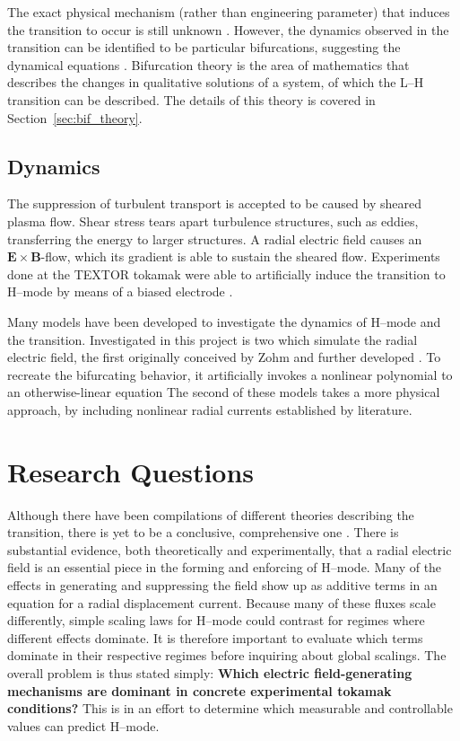 The exact physical mechanism (rather than engineering parameter) that induces the transition to occur is still unknown \cite{itoh_structural_2016}.
However, the dynamics observed in the transition can be identified to be particular bifurcations, suggesting the dynamical equations \cite{weymiens_bifurcation_2012}.
Bifurcation theory is the area of mathematics that describes the changes in qualitative solutions of a system, of which the L--H transition can be described.
The details of this theory is covered in Section~\ref{sec:bif_theory}.

\subsection{Dynamics}\label{ssec:dynamics}
The suppression of turbulent transport is accepted to be caused by sheared plasma flow.
Shear stress tears apart turbulence structures, such as eddies, transferring the energy to larger structures.
A radial electric field causes an $\mathbf{E}\times\mathbf{B}$-flow, which its gradient is able to sustain the sheared flow.
Experiments done at the TEXTOR tokamak were able to artificially induce the transition to H--mode by means of a biased electrode \cite{weynants_confinement_1992}.

Many models have been developed to investigate the dynamics of H--mode and the transition.
Investigated in this project is two which simulate the radial electric field, the first originally conceived by Zohm \cite{zohm_dynamic_1994} and further developed \cite{paquay_studying_2012} \cite{weymiens_bifurcation_2014}.
To recreate the bifurcating behavior, it artificially invokes a nonlinear polynomial to an otherwise-linear equation
The second of these models takes a more physical approach, by including nonlinear radial currents established by literature.

\section{Research Questions}\label{sec:research_questions}
Although there have been compilations of different theories describing the transition, there is yet to be a conclusive, comprehensive one \cite{connor_review_2000}.
There is substantial evidence, both theoretically and experimentally, that a radial electric field is an essential piece in the forming and enforcing of H--mode.
Many of the effects in generating and suppressing the field show up as additive terms in an equation for a radial displacement current.
Because many of these fluxes scale differently, simple scaling laws for H--mode could contrast for regimes where different effects dominate.
It is therefore important to evaluate which terms dominate in their respective regimes before inquiring about global scalings.
The overall problem is thus stated simply: \textbf{Which electric field-generating mechanisms are dominant in concrete experimental tokamak conditions?}
This is in an effort to determine which measurable and controllable values can predict H--mode.

